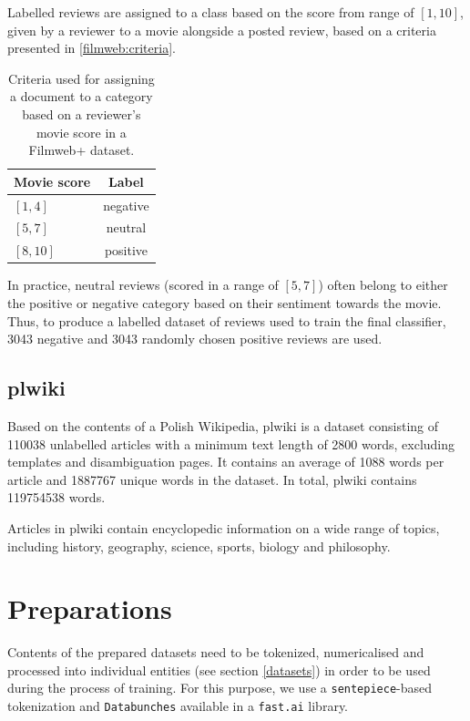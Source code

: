 Labelled reviews are assigned to a class based on the score from range of $[1, 10]$, given by a reviewer to a movie alongside a posted review, based on a criteria presented in \autoref{filmweb:criteria}.

\begin{table}[ht]
\centering
\begin{tabular}{ lc }
\toprule
Movie score & Label \\ \midrule
$[1,4]$ & negative \\
$[5, 7]$ & neutral\\
$[8, 10]$ & positive \\
\bottomrule
\end{tabular}
\caption{Criteria used for assigning a document to a category based on a reviewer's movie score in a Filmweb+ dataset.}
\label{filmweb:criteria}
\end{table}

In practice, neutral reviews (scored in a range of $[5, 7]$) often belong to either the positive or negative category based on their sentiment towards the movie. Thus, to produce a labelled dataset of reviews used to train the final classifier, 3043 negative and 3043 randomly chosen positive reviews are used.


\subsection{plwiki}
\label{plwiki}

Based on the contents of a Polish Wikipedia, plwiki is a dataset consisting of 110038 unlabelled articles with a minimum text length of 2800 words, excluding templates and disambiguation pages. It contains an average of 1088 words per article and 1887767 unique words in the dataset. In total, plwiki contains 119754538 words.

Articles in plwiki contain encyclopedic information on a wide range of topics, including history, geography, science, sports, biology and philosophy.


\section{Preparations}

Contents of the prepared datasets need to be tokenized, numericalised and processed into individual entities (see section \ref{datasets}) in order to be used during the process of training. For this purpose, we use a \lstinline{sentepiece}-based tokenization and \lstinline{Databunches} available in a \lstinline{fast.ai} library.

